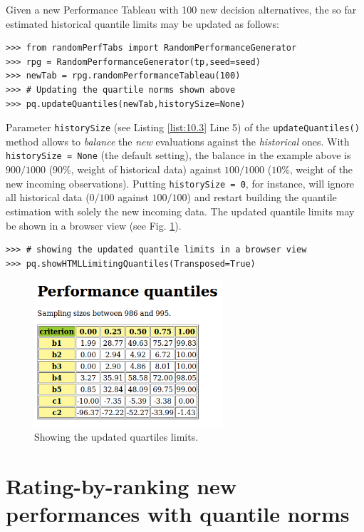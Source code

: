 Given a new Performance Tableau with 100 new decision alternatives, the so far estimated historical quantile limits may be updated as follows:

\begin{lstlisting}[caption={Generating 100 new random decision alternatives of the same model},label=list:10.3]
>>> from randomPerfTabs import RandomPerformanceGenerator
>>> rpg = RandomPerformanceGenerator(tp,seed=seed)
>>> newTab = rpg.randomPerformanceTableau(100)
>>> # Updating the quartile norms shown above 
>>> pq.updateQuantiles(newTab,historySize=None)
\end{lstlisting}

Parameter \texttt{historySize} (see Listing \ref{list:10.3} Line 5) of the \texttt{updateQuantiles()} method allows to \emph{balance} the \emph{new} evaluations against the \emph{historical} ones. With \texttt{historySize = None} (the default setting), the balance in the example above is $900/1000$ ($90\%$, weight of historical data) against $100/1000$ ($10\%$, weight of the new incoming observations). Putting \texttt{historySize = 0}, for instance, will ignore all historical data ($0/100$ against $100/100$) and restart building the quantile estimation with solely the new incoming data. The updated quantile limits may be shown in a browser view (see Fig. \ref{fig:10.1}).

\begin{lstlisting}
>>> # showing the updated quantile limits in a browser view
>>> pq.showHTMLLimitingQuantiles(Transposed=True)
\end{lstlisting}

\begin{figure}[h]
\sidecaption
\includegraphics[width=7cm]{Figures/examplePerfQuantiles.png}
\caption{Showing the updated quartiles limits.}
\label{fig:10.1}       %
\end{figure}
    

\section{Rating-by-ranking new performances with quantile norms}
\label{sec:10.3}


